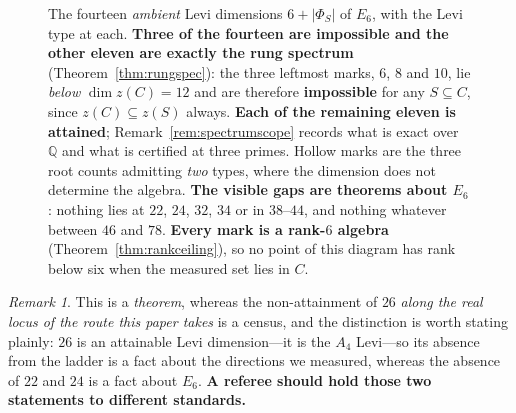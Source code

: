 \documentclass[11pt,reqno]{amsart}
\theoremstyle{plain}
\theoremstyle{definition}
\theoremstyle{remark}
\newtheorem{remark}[theorem]{Remark}
\newcommand{\Q}{\mathbb{Q}}
\begin{document}
\begin{figure}[htbp]
\caption{The fourteen \emph{ambient} Levi dimensions $6+\lvert\Phi_S\rvert$ of $E_6$, with
the Levi type at each. \textbf{Three of the fourteen are impossible and the other eleven are
exactly the rung spectrum} (Theorem~\ref{thm:rungspec}): the three leftmost marks, $6$,
$8$ and $10$, lie \emph{below} $\dim z(C)=12$ and are therefore \textbf{impossible} for any
$S\subseteq C$, since $z(C)\subseteq z(S)$ always. \textbf{Each of the remaining eleven is
attained}; Remark~\ref{rem:spectrumscope} records what is exact over $\Q$ and what is
certified at three primes.
Hollow marks are the three root counts admitting \emph{two} types, where the dimension
does not determine the algebra. \textbf{The visible gaps are theorems about $E_6$}:
nothing lies at $22$, $24$, $32$, $34$ or in $38$--$44$, and nothing whatever between $46$
and $78$. \textbf{Every mark is a rank-$6$ algebra} (Theorem~\ref{thm:rankceiling}), so no
point of this diagram has rank below six when the measured set lies in $C$.}
\label{fig:spectrum}
\end{figure}

\begin{remark}
This is a \emph{theorem}, whereas the non-attainment of $26$ \emph{along the real
locus of the route this paper takes} is a census, and the
distinction is worth stating plainly: $26$ is an attainable Levi dimension---it is the
$A_4$ Levi---so its absence from the ladder is a fact about the directions we measured,
whereas the absence of $22$ and $24$ is a fact about $E_6$. \textbf{A referee should hold
those two statements to different standards.}
\end{remark}
\end{document}
